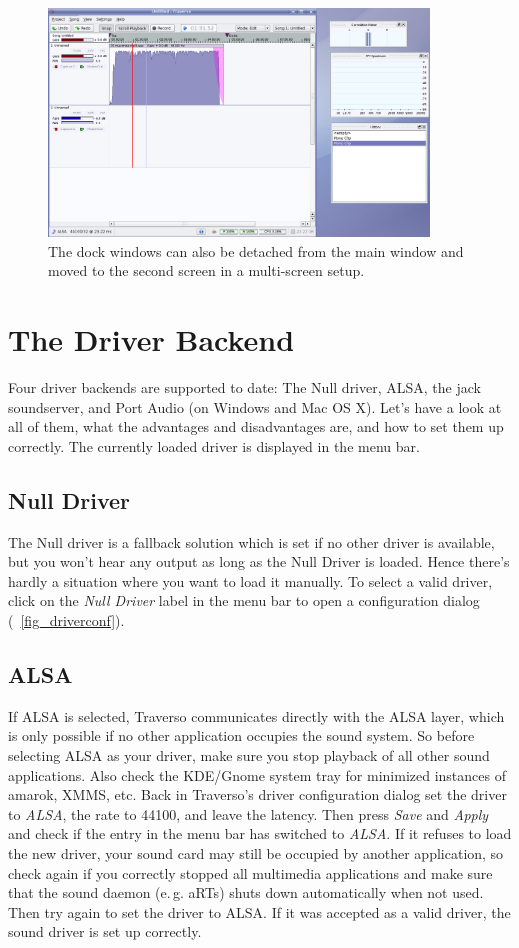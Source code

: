 \begin{figure}
 \centering\includegraphics[width=0.9\textwidth]{images/sshot03.png}
 \caption{The dock windows can also be detached from the main window and moved to the second screen in a multi-screen setup.}
 \label{fig_mainwin02}
\end{figure}

\section{The Driver Backend}
Four driver backends are supported to date: The Null driver, ALSA, the jack soundserver, and Port Audio (on Windows and Mac OS X). Let's have a look at all of them, what the advantages and disadvantages are, and how to set them up correctly. The currently loaded driver is displayed in the menu bar.

\subsection{Null Driver}
The Null driver is a fallback solution which is set if no other driver is available, but you won't hear any output as long as the Null Driver is loaded. Hence there's hardly a situation where you want to load it manually. To select a valid driver, click on the \emph{Null Driver} label in the menu bar to open a configuration dialog (\FigB\ \ref{fig_driverconf}).

\subsection{ALSA}
If ALSA is selected, Traverso communicates directly with the ALSA layer, which is only possible if no other application occupies the sound system. So before selecting ALSA as your driver, make sure you stop playback of all other sound applications. Also check the KDE/Gnome system tray for minimized instances of amarok, XMMS, etc. Back in Traverso's driver configuration dialog set the driver to \emph{ALSA}, the rate to 44100, and leave the latency. Then press \emph{Save} and \emph{Apply} and check if the entry in the menu bar has switched to \emph{ALSA}. If it refuses to load the new driver, your sound card may still be occupied by another application, so check again if you correctly stopped all multimedia applications and make sure that the sound daemon (e.\,g. aRTs) shuts down automatically when not used. Then try again to set the driver to ALSA. If it was accepted as a valid driver, the sound driver is set up correctly.

